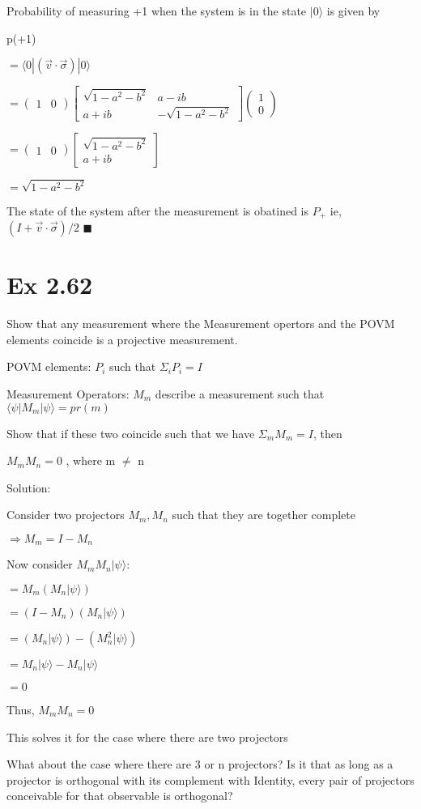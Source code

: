 \documentclass{article}
\newcommand{\0}{{$|0\rangle$}}
\newcommand{\1}{{$|1\rangle$}}
\newcommand{\2}{\frac{1}{\sqrt{2}}}
\newcommand{\psik}{|\psi\rangle}
\newcommand{\psib}{\langle\psi|}
\newcommand{\bpmx}{\begin{pmatrix}}
\newcommand{\epmx}{\end{pmatrix}}
\newcommand{\bbmx}{\begin{bmatrix}}
\newcommand{\ebmx}{\end{bmatrix}}
\begin{document}
Probability of measuring +1 when the system is in the state \0 is given by

p(+1) 

$ = \langle 0 | ( \vec{v} \cdot \vec{\sigma}) | 0 \rangle$

$ = \bpmx 1 & 0 \epmx \bbmx \sqrt{1 - a^2 -b^2} & a-ib\\ a+ib & -\sqrt{1 -a^2 -b^2}\ebmx \bpmx 1 \\ 0 \epmx$ 

$ = \bpmx 1 & 0 \epmx \bbmx \sqrt{1 - a^2 - b^2} \\ a+ib \ebmx $
    
$ = \sqrt{1 - a^2 -b^2}$

The state of the system after the measurement is obatined is $P_+$ ie, $(I + \vec{v} \cdot \vec{\sigma}) /2$
$\blacksquare$

\newpage
\section*{Ex 2.62}
Show that any measurement where the Measurement opertors and the POVM elements coincide is a projective measurement.

POVM elements: {$P_i$} such that $\Sigma_i P_i = I$

Measurement Operators: {$M_m$} describe a measurement such that $\psib M_m \psik = pr(m)$

Show that if these two coincide such that we have $\Sigma_m M_m = I$, then   

$M_mM_n = 0$ , where m $\neq$ n

Solution:

Consider two projectors $M_m, M_n$ such that they are together complete

$\Rightarrow M_m = I - M_n$

Now consider  $M_m M_n \psik$:

$ = M_m (M_n\psik)$

$= (I - M_n) (M_n \psik)$

$= (M_n \psik) - (M_n^2 \psik)$

$= M_n \psik - M_n \psik$

$= 0$

Thus, $M_m M_n = 0$

This solves it for the case where there are two projectors

What about the case where there are 3 or n projectors?
Is it that as long as a projector is orthogonal with its complement with Identity, every pair of projectors conceivable for that observable is orthogonal?
\end{document}
